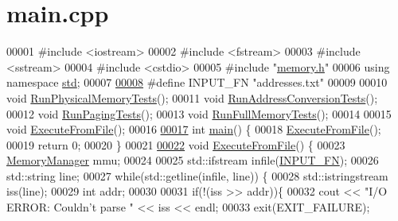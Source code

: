 \hypertarget{main_8cpp_source}{}\section{main.\+cpp}
\label{main_8cpp_source}

\begin{DoxyCode}
00001 \textcolor{preprocessor}{#include <iostream>}
00002 \textcolor{preprocessor}{#include <fstream>}
00003 \textcolor{preprocessor}{#include <sstream>}
00004 \textcolor{preprocessor}{#include <cstdio>}
00005 \textcolor{preprocessor}{#include "\hyperlink{memory_8h}{memory.h}"}
00006 \textcolor{keyword}{using namespace }\hyperlink{namespacestd}{std};
00007 
\hypertarget{main_8cpp_source.tex_l00008}{}\hyperlink{main_8cpp_a3d58a37eb1401f1e1e0a2e43a28e0675}{00008} \textcolor{preprocessor}{#define INPUT\_FN "addresses.txt"}
00009 
00010 \textcolor{keywordtype}{void} \hyperlink{main_8cpp_a5aa22abf10bfd6c47d6f04571ea77f1d}{RunPhysicalMemoryTests}();
00011 \textcolor{keywordtype}{void} \hyperlink{main_8cpp_a9d50d2049f7ee3c00984500c882ddde9}{RunAddressConversionTests}();
00012 \textcolor{keywordtype}{void} \hyperlink{main_8cpp_a31aaac7e09dbfca2c888cb8e319fcdbd}{RunPagingTests}();
00013 \textcolor{keywordtype}{void} \hyperlink{main_8cpp_ac5347a09d49e669bd79b50bf65d74e7d}{RunFullMemoryTests}();
00014 
00015 \textcolor{keywordtype}{void} \hyperlink{main_8cpp_a42ef34a387e48b6661322f8f1d6da730}{ExecuteFromFile}();
00016 
\hypertarget{main_8cpp_source.tex_l00017}{}\hyperlink{main_8cpp_ae66f6b31b5ad750f1fe042a706a4e3d4}{00017} \textcolor{keywordtype}{int} \hyperlink{main_8cpp_ae66f6b31b5ad750f1fe042a706a4e3d4}{main}() \{
00018     \hyperlink{main_8cpp_a42ef34a387e48b6661322f8f1d6da730}{ExecuteFromFile}();
00019     \textcolor{keywordflow}{return} 0;
00020 \}
00021 
\hypertarget{main_8cpp_source.tex_l00022}{}\hyperlink{main_8cpp_a42ef34a387e48b6661322f8f1d6da730}{00022} \textcolor{keywordtype}{void} \hyperlink{main_8cpp_a42ef34a387e48b6661322f8f1d6da730}{ExecuteFromFile}() \{
00023     \hyperlink{classMemoryManager}{MemoryManager} mmu;
00024 
00025     std::ifstream infile(\hyperlink{main_8cpp_a3d58a37eb1401f1e1e0a2e43a28e0675}{INPUT\_FN});
00026     std::string line;
00027     \textcolor{keywordflow}{while}(std::getline(infile, line)) \{
00028         std::istringstream iss(line);
00029         \textcolor{keywordtype}{int} addr;
00030         
00031         \textcolor{keywordflow}{if}(!(iss >> addr))\{
00032             cout << \textcolor{stringliteral}{"I/O ERROR: Couldn't parse "} << iss << endl;
00033             exit(EXIT\_FAILURE);

\end{DoxyCode}
